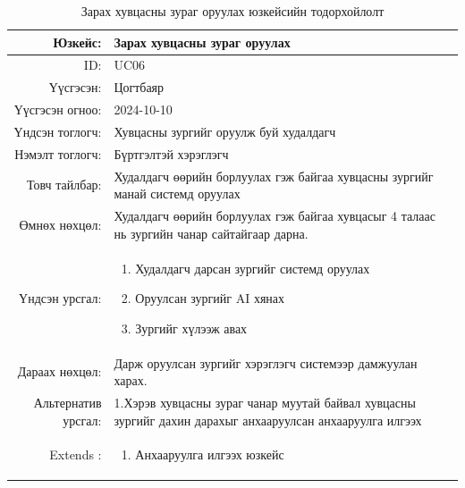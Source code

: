\newpage
\begin{longtable}{|r|p{11.5cm}|}
    \caption{Зарах хувцасны зураг оруулах юзкейсийн тодорхойлолт} 
    \label{table:songolt4}\\ \hline
    {Юзкейс:} & {Зарах хувцасны зураг оруулах}\\ \hline
    {ID:} & {UC06}\\ \hline
    {Үүсгэсэн:} & {Цогтбаяр}\\ \hline
    {Үүсгэсэн огноо:} & {2024-10-10}\\ \hline
    {Үндсэн тоглогч:} & {Хувцасны зургийг оруулж буй худалдагч}\\ \hline
    {Нэмэлт тоглогч:} & {Бүртгэлтэй хэрэглэгч}\\ \hline
    {Товч тайлбар:} & {Худалдагч өөрийн борлуулах гэж байгаа хувцасны зургийг манай системд оруулах}\\ \hline
    {Өмнөх нөхцөл:} & {Худалдагч өөрийн борлуулах гэж байгаа хувцасыг 4 талаас нь зургийн чанар сайтайгаар дарна.}\\ \hline
    {Үндсэн урсгал:} & {\begin{enumerate}
        \item Худалдагч дарсан зургийг системд оруулах
        \item Оруулсан зургийг AI хянах
        \item Зургийг хүлээж авах
        \end{enumerate}}\\ \hline
    {Дараах нөхцөл:} & {Дарж оруулсан зургийг хэрэглэгч системээр дамжуулан харах.}\\ \hline
    {Альтернатив урсгал:} & {1.Хэрэв хувцасны зураг чанар муутай байвал хувцасны зургийг дахин дарахыг анхааруулсан анхааруулга илгээх}\\ \hline
     {Extends :} & {\begin{enumerate}
        \item Анхааруулга илгээх юзкейс
    \end{enumerate}}\\ \hline
\end{longtable}
\newpage
